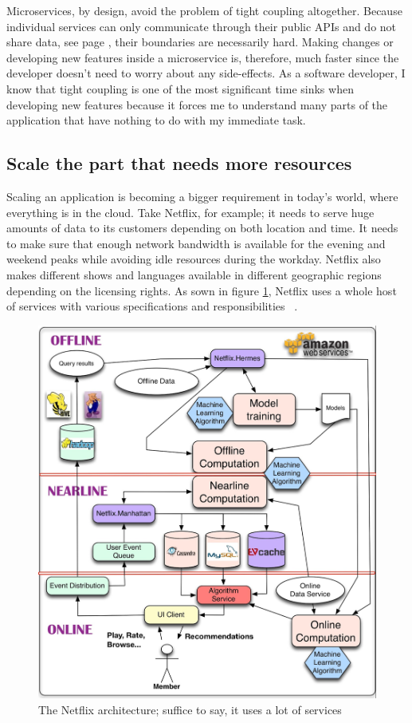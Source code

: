 Microservices, by design, avoid the problem of tight coupling altogether. Because individual services can only communicate through their public APIs and do not share data, see page \pageref{sec:theory:decentralized-data}, their boundaries are necessarily hard. Making changes or developing new features inside a microservice is, therefore, much faster since the developer doesn't need to worry about any side-effects. As a software developer, I know that tight coupling is one of the most significant time sinks when developing new features because it forces me to understand many parts of the application that have nothing to do with my immediate task.


\subsection{Scale the part that needs more resources}

Scaling an application is becoming a bigger requirement in today's world, where everything is in the cloud. Take Netflix, for example; it needs to serve huge amounts of data to its customers depending on both location and time. It needs to make sure that enough network bandwidth is available for the evening and weekend peaks while avoiding idle resources during the workday. Netflix also makes different shows and languages available in different geographic regions depending on the licensing rights. As sown in figure \ref{fix:netflix-architecture}, Netflix uses a whole host of services with various specifications and responsibilities ~\cite{netflix.2013}.

\begin{figure}[ht]
  \centering
  \includegraphics[width=0.4\linewidth]{assets/netflix-architecture.png}
  \caption[The Netflix architecture]{The Netflix architecture; suffice to say, it uses a lot of services ~\cite{netflix.2013}}
  \label{fix:netflix-architecture}
\end{figure}

